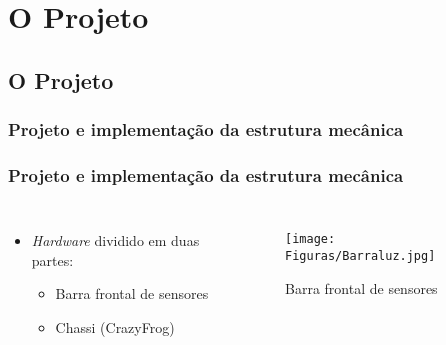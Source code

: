 \section{O Projeto}


\subsection{O Projeto}

\begin{frame}
\frametitle{Projeto e implementação da estrutura mecânica}
\begin{itemize}

\end{itemize}
\end{frame}

\begin{frame}
\frametitle{Projeto e implementação da estrutura mecânica}
\begin{columns}

	\begin{itemize}
	\item \textit{Hardware} dividido em duas partes:
		\begin{itemize}
		\item Barra frontal de sensores
		\item Chassi (CrazyFrog)
		\end{itemize}
	\end{itemize}
	
	\begin{figure}[th]
	\centering
	\captionsetup{width=0.65\textwidth,font=footnotesize,textfont=bf}
	\texttt{[image: Figuras/Barraluz.jpg]}
	\caption{Barra frontal de sensores}
	\end{figure}

\end{columns}
\end{frame}


